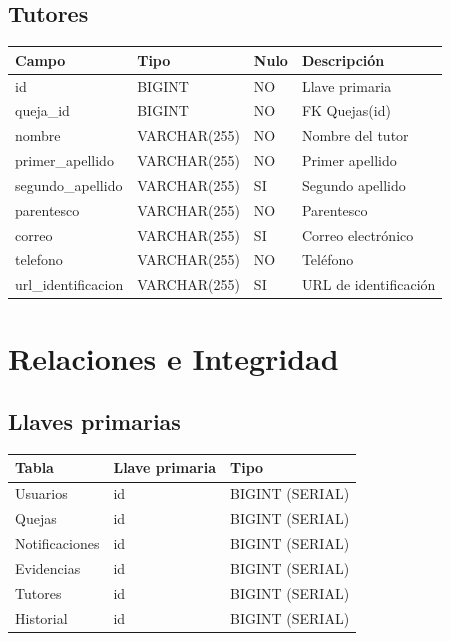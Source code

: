 \documentclass[11pt,letterpaper]{article}
\begin{document}
\subsection{Tutores}
\begin{longtable}{|p{4.2cm}|p{3.2cm}|p{2.2cm}|p{4.5cm}|}
\hline
\rowcolor{lightgray} \textbf{Campo} & \textbf{Tipo} & \textbf{Nulo} & \textbf{Descripción} \\
\hline
id & BIGINT & NO & Llave primaria \\
\hline
queja\_id & BIGINT & NO & FK Quejas(id) \\
\hline
nombre & VARCHAR(255) & NO & Nombre del tutor \\
\hline
primer\_apellido & VARCHAR(255) & NO & Primer apellido \\
\hline
segundo\_apellido & VARCHAR(255) & SI & Segundo apellido \\
\hline
parentesco & VARCHAR(255) & NO & Parentesco \\
\hline
correo & VARCHAR(255) & SI & Correo electrónico \\
\hline
telefono & VARCHAR(255) & NO & Teléfono \\
\hline
url\_identificacion & VARCHAR(255) & SI & URL de identificación \\
\hline
\end{longtable}

\section{Relaciones e Integridad}

\subsection{Llaves primarias}
\begin{longtable}{|p{4cm}|p{4cm}|p{6cm}|}
\hline
\rowcolor{lightgray} \textbf{Tabla} & \textbf{Llave primaria} & \textbf{Tipo} \\
\hline
Usuarios & id & BIGINT (SERIAL) \\
\hline
Quejas & id & BIGINT (SERIAL) \\
\hline
Notificaciones & id & BIGINT (SERIAL) \\
\hline
Evidencias & id & BIGINT (SERIAL) \\
\hline
Tutores & id & BIGINT (SERIAL) \\
\hline
Historial & id & BIGINT (SERIAL) \\
\hline
\end{longtable}
\end{document}
